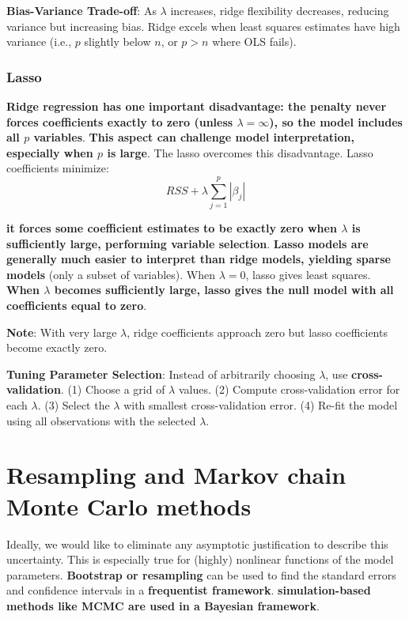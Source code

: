 \documentclass[12pt,a4paper]{article}
\begin{document}
\vspace{0.5em}

\textbf{Bias-Variance Trade-off}: As $\lambda$ increases, ridge flexibility decreases, reducing variance but increasing bias. Ridge excels when least squares estimates have high variance (i.e., $p$ slightly below $n$, or $p > n$ where OLS fails).

\subsubsection{Lasso}

\textbf{Ridge regression has one important disadvantage: the penalty never forces coefficients exactly to zero (unless $\lambda = \infty$), so the model includes all $p$ variables}. \textbf{This aspect can challenge model interpretation, especially when $p$ is large}. The lasso overcomes this disadvantage. Lasso coefficients minimize:
\[
RSS + \lambda \sum_{j=1}^{p}|\beta_j|
\]

\textbf{it forces some coefficient estimates to be exactly zero when $\lambda$ is sufficiently large, performing variable selection}. \textbf{Lasso models are generally much easier to interpret than ridge models, yielding sparse models} (only a subset of variables). When $\lambda = 0$, lasso gives least squares. \textbf{When $\lambda$ becomes sufficiently large, lasso gives the null model with all coefficients equal to zero}.

\vspace{0.5em}

\textbf{Note}: With very large $\lambda$, ridge coefficients approach zero but lasso coefficients become exactly zero.

\vspace{0.5em}

\textbf{Tuning Parameter Selection}: Instead of arbitrarily choosing $\lambda$, use \textbf{cross-validation}. (1) Choose a grid of $\lambda$ values. (2) Compute cross-validation error for each $\lambda$. (3) Select the $\lambda$ with smallest cross-validation error. (4) Re-fit the model using all observations with the selected $\lambda$.


\section{Resampling and Markov chain Monte Carlo methods}

Ideally, we would like to eliminate any asymptotic justification to describe this uncertainty. This is especially true for (highly) nonlinear functions of the model parameters. \textbf{Bootstrap or resampling} can be used to find the standard errors and
confidence intervals in a \textbf{frequentist framework}. \textbf{simulation-based methods like MCMC are used in a Bayesian framework}.
\end{document}
